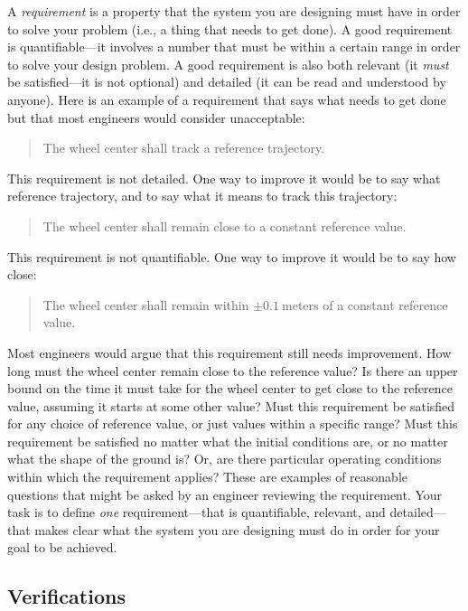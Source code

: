 \documentclass[conf]{new-aiaa}
\begin{document}
A {\em requirement} is a property that the system you are designing must have in order to solve your problem (i.e., a thing that needs to get done). A good requirement is quantifiable---it involves a number that must be within a certain range in order to solve your design problem. A good requirement is also both relevant (it {\em must} be satisfied---it is not optional) and detailed (it can be read and understood by anyone). Here is an example of a requirement that says what needs to get done but that most engineers would consider unacceptable:
\begin{quote}
The wheel center shall track a reference trajectory.
\end{quote}
This requirement is not detailed. One way to improve it would be to say what reference trajectory, and to say what it means to track this trajectory:
\begin{quote}
The wheel center shall remain close to a constant reference value.
\end{quote}
This requirement is not quantifiable. One way to improve it would be to say how close:
\begin{quote}
The wheel center shall remain within $\pm 0.1~\text{meters}$ of a constant reference value.
\end{quote}
Most engineers would argue that this requirement still needs improvement. How long must the wheel center remain close to the reference value? Is there an upper bound on the time it must take for the wheel center to get close to the reference value, assuming it starts at some other value? Must this requirement be satisfied for any choice of reference value, or just values within a specific range? Must this requirement be satisfied no matter what the initial conditions are, or no matter what the shape of the ground is? Or, are there particular operating conditions within which the requirement applies? These are examples of reasonable questions that might be asked by an engineer reviewing the requirement. Your task is to define {\em one} requirement---that is quantifiable, relevant, and detailed---that makes clear what the system you are designing must do in order for your goal to be achieved.

\subsection{Verifications}
\label{secVerifications}
\end{document}
